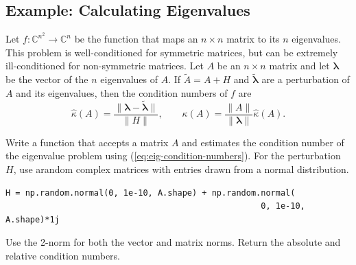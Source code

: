 \subsection*{Example: Calculating Eigenvalues} %

Let $f:\mathbb{C}^{n^2} \rightarrow \mathbb{C}^n$ be the function that maps an $n \times n$ matrix to its $n$ eigenvalues.
This problem is well-conditioned for symmetric matrices, but can be extremely ill-conditioned for non-symmetric matrices.
Let $A$ be an $n\times n$ matrix and let $\boldsymbol{\lambda}$ be the vector of the $n$ eigenvalues of $A$.
If $\tilde{A} = A + H$ and $\tilde{\boldsymbol{\lambda}}$ are a perturbation of $A$ and its eigenvalues, then the condition numbers of $f$ are
\begin{equation}
\hat{\kappa}(A) = \frac{\|\boldsymbol{\lambda} - \tilde{\boldsymbol{\lambda}}\|}{\|H\|},
\qquad
\kappa(A) = \frac{\|A\|}{\|\boldsymbol{\lambda}\|}\hat{\kappa}(A).
\label{eq:eig-condition-numbers}
\end{equation}

\begin{problem}\label{prob:eigenvalue} %
Write a function that accepts a matrix $A$ and estimates the condition number of the eigenvalue problem using (\ref{eq:eig-condition-numbers}).
For the perturbation $H$, use arandom complex matrices with entries drawn from a normal distribution.
\begin{lstlisting}
H = np.random.normal(0, 1e-10, A.shape) + np.random.normal(
                                                    0, 1e-10, A.shape)*1j
\end{lstlisting}

Use the 2-norm for both the vector and matrix norms.
Return the absolute and relative condition numbers.
\label{prob:eig-condit}
\end{problem}

